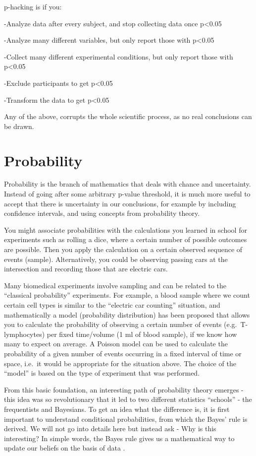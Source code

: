 \documentclass[
]{book}
\begin{document}
p-hacking is if you:

-Analyze data after every subject, and stop collecting data once p\textless0.05

-Analyze many different variables, but only report those with p\textless0.05

-Collect many different experimental conditions, but only report those with p\textless0.05

-Exclude participants to get p\textless0.05

-Transform the data to get p\textless0.05

Any of the above, corrupts the whole scientific process, as no real conclusions can be drawn.

\hypertarget{probability}{%
\section{Probability}\label{probability}}

Probability is the branch of mathematics that deals with chance and uncertainty. Instead of going after some arbitrary p-value threshold, it is much more useful to accept that there is uncertainty in our conclusions, for example by including confidence intervals, and using concepts from probability theory.

You might associate probabilities with the calculations you learned in school for experiments such as rolling a dice, where a certain number of possible outcomes are possible. Then you apply the calculation on a certain observed sequence of events (sample). Alternatively, you could be observing passing cars at the intersection and recording those that are electric cars.

Many biomedical experiments involve sampling and can be related to the ``classical probability'' experiments. For example, a blood sample where we count certain cell types is similar to the ``electric car counting'' situation, and mathematically a model (probability distribution) has been proposed that allows you to calculate the probability of observing a certain number of events (e.g.~T-lymphocytes) per fixed time/volume (1 ml of blood sample), if we know how many to expect on average. A Poisson model can be used to calculate the probability of a given number of events occurring in a fixed interval of time or space, i.e.~it would be appropriate for the situation above. The choice of the ``model'' is based on the type of experiment that was performed.

From this basic foundation, an interesting path of probability theory emerges - this idea was so revolutionary that it led to two different statistics ``schools'' - the frequentists and Bayesians. To get an idea what the difference is, it is first important to understand conditional probabilities, from which the Bayes' rule is derived. We will not go into details here but instead ask - Why is this interesting? In simple words, the Bayes rule gives us a mathematical way to update our beliefs on the basis of data .
\end{document}
